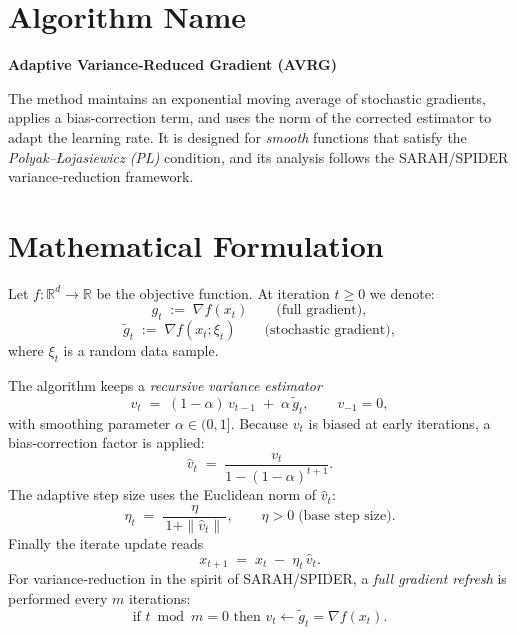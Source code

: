 \documentclass{article}
\begin{document}
\section*{Algorithm Name}
\textbf{Adaptive Variance‑Reduced Gradient (AVRG)}  

The method maintains an exponential moving average of stochastic gradients,
applies a bias‑correction term, and uses the norm of the corrected estimator
to adapt the learning rate.  It is designed for \emph{smooth} functions that
satisfy the \emph{Polyak–Łojasiewicz (PL)} condition, and its analysis follows
the SARAH/SPIDER variance‑reduction framework.

\section*{Mathematical Formulation}
Let $f:\mathbb{R}^d\rightarrow\mathbb{R}$ be the objective function.
At iteration $t\ge 0$ we denote:
\[
g_t \;:=\; \nabla f(x_t)                         \qquad\text{(full gradient)},
\]
\[
\tilde g_t \;:=\; \nabla f(x_t;\xi_t)            \qquad\text{(stochastic gradient)},
\]
where $\xi_t$ is a random data sample.  

The algorithm keeps a \emph{recursive variance estimator}
\begin{equation}
v_t \;=\;(1-\alpha)\,v_{t-1}\;+\;\alpha\,\tilde g_t,
\qquad v_{-1}=0,
\label{eq:vt}
\end{equation}
with smoothing parameter $\alpha\in(0,1]$.
Because $v_t$ is biased at early iterations, a bias‑correction factor is
applied:
\begin{equation}
\hat v_t \;=\;\frac{v_t}{1-(1-\alpha)^{t+1}} .
\label{eq:hatvt}
\end{equation}
The adaptive step size uses the Euclidean norm of $\hat v_t$:
\begin{equation}
\eta_t \;=\;\frac{\eta}{\,1+\|\hat v_t\|\,},
\qquad \eta>0\;\text{(base step size)} .
\label{eq:etat}
\end{equation}
Finally the iterate update reads
\begin{equation}
x_{t+1}\;=\;x_t\;-\;\eta_t\,\hat v_t .
\label{eq:update}
\end{equation}
For variance‑reduction in the spirit of SARAH/SPIDER, a \emph{full gradient
refresh} is performed every $m$ iterations:
\[
\text{if }t\bmod m =0\text{ then }v_t\gets \tilde g_t = \nabla f(x_t).
\]
\end{document}
